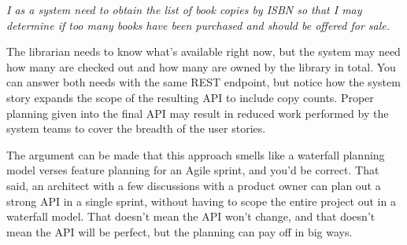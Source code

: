 \textit{I as a system need to obtain the list of book copies by ISBN so that I may determine if too many books have been purchased and should be offered for sale.}

The librarian needs to know what's available right now, but the system may need how many are checked out and how many are owned by the library in total.  You can answer both needs with the same REST endpoint, but notice how the system story expands the scope of the resulting API to include copy counts.  Proper planning given into the final API may result in reduced work performed by the system teams to cover the breadth of the user stories.

The argument can be made that this approach smells like a waterfall planning model verses feature planning for an Agile sprint, and you'd be correct.  That said, an architect with a few discussions with a product owner can plan out a strong API in a single sprint, without having to scope the entire project out in a waterfall model.  That doesn't mean the API won't change, and that doesn't mean the API will be perfect, but the planning can pay off in big ways.
